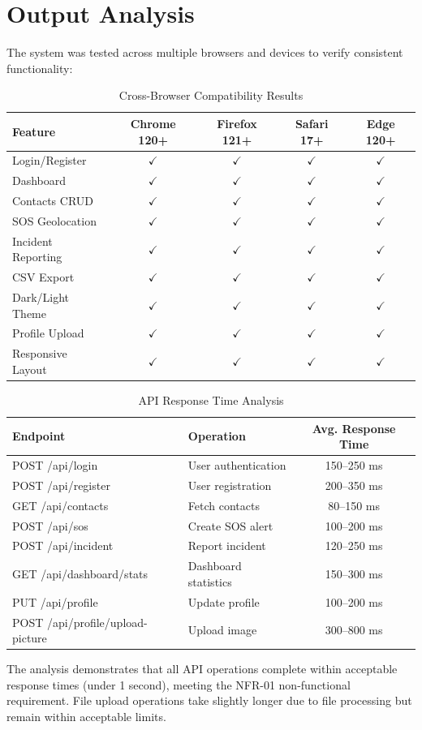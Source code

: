 \section{Output Analysis}

The system was tested across multiple browsers and devices to verify consistent functionality:

\begin{table}[H]
  \centering
  \caption{Cross-Browser Compatibility Results}
  \label{tab:browser-compat}
  \begin{tabularx}{\textwidth}{@{}l c c c c@{}}
    \toprule
    \textbf{Feature} & \textbf{Chrome 120+} & \textbf{Firefox 121+} & \textbf{Safari 17+} & \textbf{Edge 120+} \\
    \midrule
    Login/Register & $\checkmark$ & $\checkmark$ & $\checkmark$ & $\checkmark$ \\
    Dashboard & $\checkmark$ & $\checkmark$ & $\checkmark$ & $\checkmark$ \\
    Contacts CRUD & $\checkmark$ & $\checkmark$ & $\checkmark$ & $\checkmark$ \\
    SOS Geolocation & $\checkmark$ & $\checkmark$ & $\checkmark$ & $\checkmark$ \\
    Incident Reporting & $\checkmark$ & $\checkmark$ & $\checkmark$ & $\checkmark$ \\
    CSV Export & $\checkmark$ & $\checkmark$ & $\checkmark$ & $\checkmark$ \\
    Dark/Light Theme & $\checkmark$ & $\checkmark$ & $\checkmark$ & $\checkmark$ \\
    Profile Upload & $\checkmark$ & $\checkmark$ & $\checkmark$ & $\checkmark$ \\
    Responsive Layout & $\checkmark$ & $\checkmark$ & $\checkmark$ & $\checkmark$ \\
    \bottomrule
  \end{tabularx}
\end{table}

\begin{table}[H]
  \centering
  \caption{API Response Time Analysis}
  \label{tab:response-time}
  \begin{tabularx}{\textwidth}{@{}l X c@{}}
    \toprule
    \textbf{Endpoint} & \textbf{Operation} & \textbf{Avg. Response Time} \\
    \midrule
    POST /api/login & User authentication & 150--250 ms \\
    POST /api/register & User registration & 200--350 ms \\
    GET /api/contacts & Fetch contacts & 80--150 ms \\
    POST /api/sos & Create SOS alert & 100--200 ms \\
    POST /api/incident & Report incident & 120--250 ms \\
    GET /api/dashboard/stats & Dashboard statistics & 150--300 ms \\
    PUT /api/profile & Update profile & 100--200 ms \\
    POST /api/profile/upload-picture & Upload image & 300--800 ms \\
    \bottomrule
  \end{tabularx}
\end{table}

The analysis demonstrates that all API operations complete within acceptable response times (under 1 second), meeting the NFR-01 non-functional requirement. File upload operations take slightly longer due to file processing but remain within acceptable limits.
